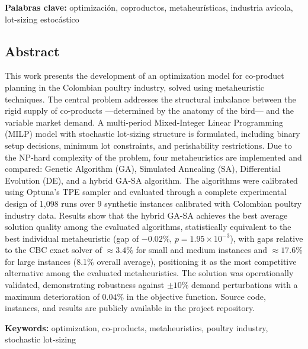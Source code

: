 \documentclass[
  spanish,
  12pt,
]{article}
\begin{document}
\textbf{Palabras clave:} optimización, coproductos, metaheurísticas,
industria avícola, lot-sizing estocástico

\newpage

\subsection{Abstract}\label{abstract}

This work presents the development of an optimization model for
co-product planning in the Colombian poultry industry, solved using
metaheuristic techniques. The central problem addresses the structural
imbalance between the rigid supply of co-products ---determined by the
anatomy of the bird--- and the variable market demand. A multi-period
Mixed-Integer Linear Programming (MILP) model with stochastic lot-sizing
structure is formulated, including binary setup decisions, minimum lot
constraints, and perishability restrictions. Due to the NP-hard
complexity of the problem, four metaheuristics are implemented and
compared: Genetic Algorithm (GA), Simulated Annealing (SA), Differential
Evolution (DE), and a hybrid GA-SA algorithm. The algorithms were
calibrated using Optuna's TPE sampler and evaluated through a complete
experimental design of 1,098 runs over 9 synthetic instances calibrated
with Colombian poultry industry data. Results show that the hybrid GA-SA
achieves the best average solution quality among the evaluated
algorithms, statistically equivalent to the best individual
metaheuristic (gap of \(-0.02\%\), \(p = 1.95 \times 10^{-3}\)), with
gaps relative to the CBC exact solver of \(\approx 3.4\%\) for small and
medium instances and \(\approx 17.6\%\) for large instances (8.1\%
overall average), positioning it as the most competitive alternative
among the evaluated metaheuristics. The solution was operationally
validated, demonstrating robustness against \(\pm 10\%\) demand
perturbations with a maximum deterioration of \(0.04\%\) in the
objective function. Source code, instances, and results are publicly
available in the project repository.

\textbf{Keywords:} optimization, co-products, metaheuristics, poultry
industry, stochastic lot-sizing

\newpage

\tableofcontents

\newpage

\listoffigures

\newpage

\listoftables
\end{document}
